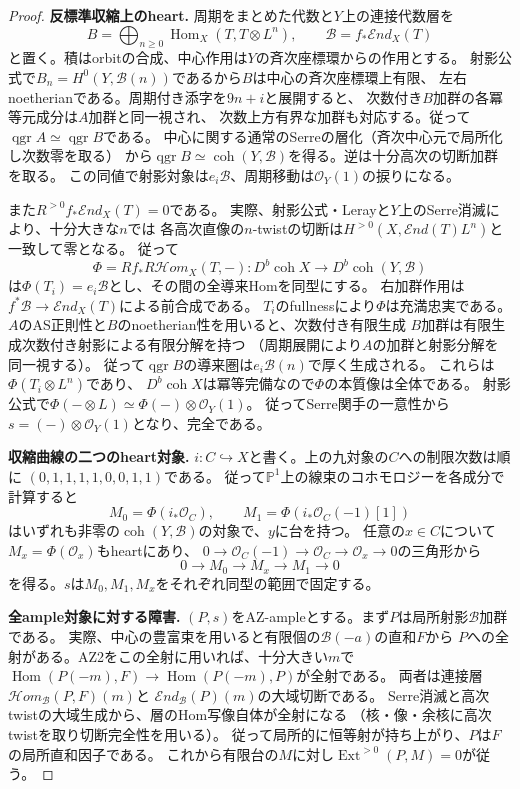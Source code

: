 \documentclass[11pt,a4paper]{ltjsarticle}
\theoremstyle{definition}
\newcommand{\qgr}{\operatorname{qgr}}
\newcommand{\coh}{\operatorname{coh}}
\begin{document}
\begin{proof}
\medskip
\noindent\textbf{反標準収縮上のheart.}
周期をまとめた代数と$Y$上の連接代数層を
\[
 B=\bigoplus_{n\geq0}\operatorname{Hom}_X(T,T\otimes L^n),
 \qquad \mathscr B=f_*\mathcal End_X(T)
\]
と置く。積はorbitの合成、中心作用は$Y$の斉次座標環からの作用とする。
射影公式で$B_n=H^0(Y,\mathscr B(n))$であるから$B$は中心の斉次座標環上有限、
左右noetherianである。周期付き添字を$9n+i$と展開すると、
次数付き$B$加群の各冪等元成分は$A$加群と同一視され、
次数上方有界な加群も対応する。従って$\qgr A\simeq\qgr B$である。
中心に関する通常のSerreの層化（斉次中心元で局所化し次数零を取る）
から$\qgr B\simeq\coh(Y,\mathscr B)$を得る。逆は十分高次の切断加群を取る。
この同値で射影対象は$e_i\mathscr B$、周期移動は$\mathcal O_Y(1)$の捩りになる。

また$R^{>0} f_*\mathcal End_X(T)=0$である。
実際、射影公式・Lerayと$Y$上のSerre消滅により、十分大きな$n$では
各高次直像の$n$-twistの切断は$H^{>0}(X,\mathcal End(T)L^n)$と一致して零となる。
従って
\[
 \Phi=Rf_*R\mathcal Hom_X(T,-):
     D^b\coh X\longrightarrow D^b\coh(Y,\mathscr B)
\]
は$\Phi(T_i)=e_i\mathscr B$とし、その間の全導来Homを同型にする。
右加群作用は$f^*\mathscr B\to\mathcal End_X(T)$による前合成である。
$T_i$のfullnessにより$\Phi$は充満忠実である。
$A$のAS正則性と$B$のnoetherian性を用いると、次数付き有限生成
$B$加群は有限生成次数付き射影による有限分解を持つ
（周期展開により$A$の加群と射影分解を同一視する）。
従って$\qgr B$の導来圏は$e_i\mathscr B(n)$で厚く生成される。
これらは$\Phi(T_i\otimes L^n)$であり、
$D^b\coh X$は冪等完備なので$\Phi$の本質像は全体である。
射影公式で$\Phi(-\otimes L)\simeq\Phi(-)\otimes\mathcal O_Y(1)$。
従ってSerre関手の一意性から$s=(-)\otimes\mathcal O_Y(1)$となり、完全である。

\medskip
\noindent\textbf{収縮曲線の二つのheart対象.}
$i:C\hookrightarrow X$と書く。上の九対象の$C$への制限次数は順に
$(0,1,1,1,1,0,0,1,1)$である。
従って$\mathbb P^1$上の線束のコホモロジーを各成分で計算すると
\[
 M_0=\Phi(i_*\mathcal O_C),\qquad
 M_1=\Phi(i_*\mathcal O_C(-1)[1])
\]
はいずれも非零の$\coh(Y,\mathscr B)$の対象で、$y$に台を持つ。
任意の$x\in C$について$M_x=\Phi(\mathcal O_x)$もheartにあり、
$0\to\mathcal O_C(-1)\to\mathcal O_C\to\mathcal O_x\to0$の三角形から
\[
 0\to M_0\to M_x\to M_1\to0
\]
を得る。$s$は$M_0,M_1,M_x$をそれぞれ同型の範囲で固定する。

\medskip
\noindent\textbf{全ample対象に対する障害.}
$(P,s)$をAZ-ampleとする。まず$P$は局所射影$\mathscr B$加群である。
実際、中心の豊富束を用いると有限個の$\mathscr B(-a)$の直和$F$から
$P$への全射がある。AZ2をこの全射に用いれば、十分大きい$m$で
$\operatorname{Hom}(P(-m),F)\to\operatorname{Hom}(P(-m),P)$が全射である。
両者は連接層$\mathcal Hom_{\mathscr B}(P,F)(m)$と
$\mathcal End_{\mathscr B}(P)(m)$の大域切断である。
Serre消滅と高次twistの大域生成から、層のHom写像自体が全射になる
（核・像・余核に高次twistを取り切断完全性を用いる）。
従って局所的に恒等射が持ち上がり、$P$は$F$の局所直和因子である。
これから有限台の$M$に対し$\operatorname{Ext}^{>0}(P,M)=0$が従う。


\end{proof}
\end{document}
